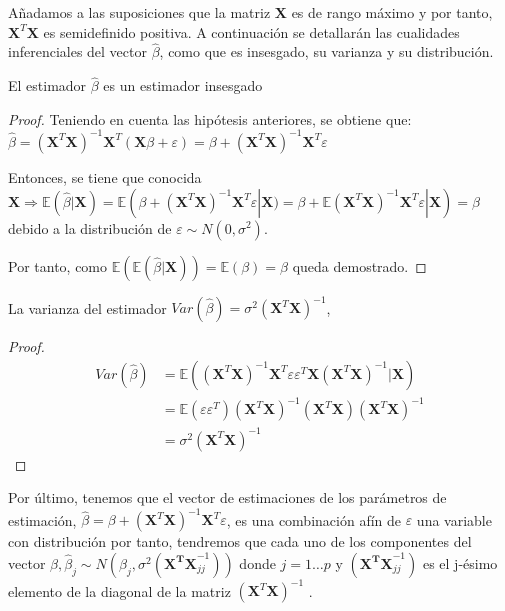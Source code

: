 \noindent Añadamos a las suposiciones  que la matriz $\mathbf{X}$ es de rango máximo y por tanto, $\mathbf{X}^T\mathbf{X}$ es semidefinido positiva.
A continuación se detallarán las cualidades inferenciales del vector $\hat{\beta}$, como que es insesgado, su varianza y su distribución. 

\begin{propo}
El estimador $\hat{\beta}$ es un estimador insesgado \cite{Greene 2008}
\begin{proof}  

\noindent Teniendo en cuenta las hipótesis anteriores, se obtiene que: $\hat{\beta}=(\mathbf{X}^T\mathbf{X})^{-1}\mathbf{X}^T(\mathbf{X}\beta+\varepsilon)=\beta+(\mathbf{X}^T\mathbf{X})^{-1}\mathbf{X}^T \varepsilon$

\noindent Entonces, se tiene que conocida $\mathbf{X} \Rightarrow \mathbb{E}(\hat{\beta}|\mathbf{X})=\mathbb{E}(\beta+(\mathbf{X}^T\mathbf{X})^{-1}\mathbf{X}^T \varepsilon|\mathbf{X})=\beta +\mathbb{E}(\mathbf{X}^T\mathbf{X})^{-1}\mathbf{X}^T \varepsilon|\mathbf{X})=\beta$ debido a la distribución de $\varepsilon\sim N(0,\sigma^2)$.

\noindent Por tanto, como $\mathbb{E}(\mathbb{E}(\hat{\beta}|\mathbf{X}))=\mathbb{E}(\beta)=\beta$ queda demostrado. 
\end{proof}
\end{propo}
\begin{propo}
La varianza del estimador $Var(\hat{\beta})= \sigma^2 (\mathbf{X}^T \mathbf{X})^{-1}$\cite{Hastie 2001},\cite{Greene 2008}
\begin{proof}
\begin{equation}
\begin{split}
Var(\hat{\beta})&=\mathbb{E}((\mathbf{X}^T \mathbf{X})^{-1}\mathbf{X}^T \varepsilon \varepsilon^T\mathbf{X}(\mathbf{X}^T \mathbf{X})^{-1}|\mathbf{X})\\
&=\mathbb{E}(\varepsilon\varepsilon^T) (\mathbf{X}^T \mathbf{X})^{-1}(\mathbf{X}^T \mathbf{X})(\mathbf{X}^T \mathbf{X})^{-1} \\
&=\sigma^2 (\mathbf{X}^T \mathbf{X})^{-1}
\end{split}
\end{equation}\qedhere
\end{proof}
\end{propo}
\noindent Por último, tenemos que el vector de estimaciones de los parámetros de estimación, $\hat{\beta}= \beta+(\mathbf{X}^T\mathbf{X})^{-1}\mathbf{X}^T \varepsilon$, es una combinación afín de $\varepsilon$ una variable con distribución por tanto, tendremos que cada uno de los componentes del vector $\hat{\beta},\hat{\beta}_j\sim N(\beta_j, \sigma^2(\mathbf{X^TX}_{jj}^{-1}))$ donde $ j=1\ldots p$ y $(\mathbf{X^TX}_{jj}^{-1})$ es el j-ésimo elemento de la diagonal de la matriz $(\mathbf{X}^T\mathbf{X})^{-1}$ \cite{Johnson 2007}.

